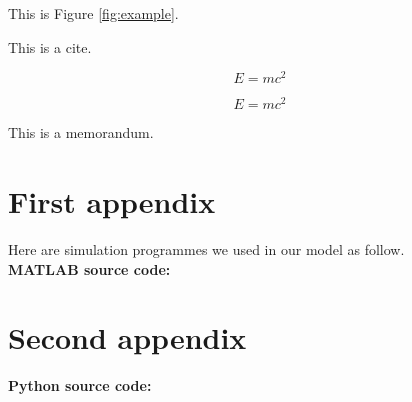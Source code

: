 \documentclass{mcmthesis}  %
\begin{document}
This is Figure \eqref{fig:example}.  %

This is a cite\cite{vaswani2017attention}.  %

\begin{equation}  %
E = mc^2 \label{aa}  %
\end{equation}  %

\begin{equation}  %
\nonumber %
E = mc^2
\end{equation}  %

\printbibliography  %


\begin{appendices}  %

\begin{memo}[Memorandum]  %
	This is a memorandum.
\end{memo}  %

\section{First appendix}  %

Here are simulation programmes we used in our model as follow.\\
\textbf{MATLAB source code:}


\section{Second appendix}  %

\textbf{Python source code:}


\end{appendices}  %
\end{document}
